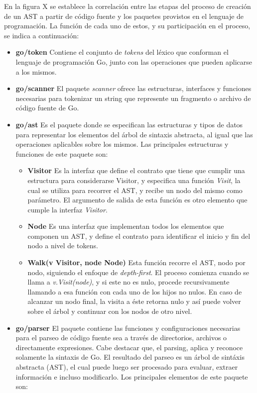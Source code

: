 En la figura X se establece la correlación entre las etapas del proceso de creación de un AST a partir de código fuente y los paquetes provistos en el lenguaje de programación.
La función de cada uno de estos, y su participación en el proceso, se indica a continuación:
\begin{itemize}
  \item \textbf{go/token} Contiene el conjunto de \textit{tokens} del léxico que conforman el lenguaje de programación Go, junto con las operaciones que pueden aplicarse a los mismos.
  
  \item \textbf{go/scanner} El paquete \textit{scanner} ofrece las estructuras, interfaces y funciones necesarias para tokenizar un string que represente un fragmento o archivo de código fuente de Go.
  
  \item \textbf{go/ast} Es el paquete donde se especifican las estructuras y tipos de datos para representar los elementos del árbol de sintaxis abstracta, al igual que las operaciones aplicables sobre los mismos.
  Las principales estructuras y funciones de este paquete son:
  \begin{itemize}
    \item \textbf{Visitor} Es la interfaz que define el contrato que tiene que cumplir una estructura para considerarse Visitor, y especifica una función \textit{Visit}, la cual se utiliza para recorrer el AST, y recibe un nodo del mismo como parámetro.
    El argumento de salida de esta función es otro elemento que cumple la interfaz \textit{Visitor}.

    \item \textbf{Node} Es una interfaz que implementan todos los elementos que componen un AST, y define el contrato para identificar el inicio y fin del nodo a nivel de tokens.

    \item \textbf{Walk(v Visitor, node Node)} Esta función recorre el AST, nodo por nodo, siguiendo el enfoque de \textit{depth-first}.
    El proceso comienza cuando se llama a \textit{v.Visit(node)}, y si este no es nulo, procede recursivamente llamando a esa función con cada uno de los hijos no nulos.
    En caso de alcanzar un nodo final, la visita a éste retorna nulo y así puede volver sobre el árbol y continuar con los nodos de otro nivel.
  \end{itemize}
  
  \item \textbf{go/parser} El paquete contiene las funciones y configuraciones necesarias para el parseo de código fuente sea a través de directorios, archivos o directamente expresiones. Cabe destacar que, el parsing, aplica y reconoce solamente la sintaxis de Go.
  El resultado del parseo es un árbol de sintáxis abstracta (AST), el cual puede luego ser procesado para evaluar, extraer información e incluso modificarlo.
  Los principales elementos de este paquete son:


\end{itemize}
